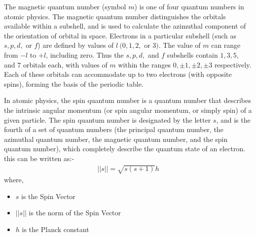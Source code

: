 \begin{chembox}{}
{The magnetic quantum number (symbol $m$) is one of four quantum numbers in atomic physics. The magnetic quantum number distinguishes the orbitals available within a subshell, and is used to calculate the azimuthal component of the orientation of orbital in space. Electrons in a particular subshell (such as $s, p, d,$ or $f$) are defined by values of $l~(0, 1, 2, $ or $ 3)$. The value of $m$ can range from $-l$ to $+l$, including zero. Thus the $s, p, d,$ and $f$ subshells contain $1, 3, 5, $ and $ 7$ orbitals each, with values of $m$ within the ranges $0, \pm 1, \pm 2, \pm 3$ respectively. Each of these orbitals can accommodate up to two electrons (with opposite spins), forming the basis of the periodic table.}
\end{chembox}
\begin{chembox}{}
{In atomic physics, the spin quantum number is a quantum number that describes the intrinsic angular momentum (or spin angular momentum, or simply spin) of a given particle. The spin quantum number is designated by the letter $s$, and is the fourth of a set of quantum numbers (the principal quantum number, the azimuthal quantum number, the magnetic quantum number, and the spin quantum number), which completely describe the quantum state of an electron.
this can be written as:-
\begin{align*}
 ||s|| = \sqrt{s(s+1)}h
\end{align*}
where, 
\begin{itemize}
    \item {$s$ is the Spin Vector }
    \item{$||s||$ is the norm of the Spin Vector}
    \item{$h$ is the Planck constant}
\end{itemize}
}
\end{chembox}
